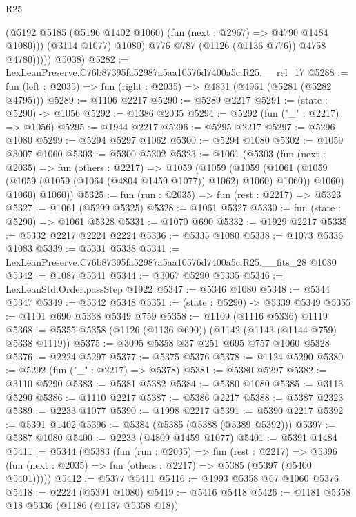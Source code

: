 \begin{lexlean}{R25}
\begin{coremodule}
                    (@5192 @5185 (@5196 @1402 @1060) (fun (next : @2967) => @4790 @1484 @1080)))
                  (@3114 @1077)
                  @1080)
                @776
                @787
                (@1126 (@1136 @776))
                @4758
                @4780)))))
      @5038)
@5282 := LexLeanPreserve.C76b87395fa52987a5aa10576d7400a5c.R25.__rel_17
@5288 := fun (left : @2035) => fun (right : @2035) => @4831 (@4961 (@5281 (@5282 @4795)))
@5289 := @1106 @2217
@5290 := @5289 @2217
@5291 := (state : @5290) -> @1056
@5292 := @1386 @2035
@5294 := @5292 (fun ("_" : @2217) => @1056)
@5295 := @1944 @2217
@5296 := @5295 @2217
@5297 := @5296 @1080
@5299 := @5294 @5297 @1062
@5300 := @5294 @1080
@5302 := @1059 @3007 @1060
@5303 := @5300 @5302
@5323 := @1061
    (@5303
      (fun (next : @2035) =>
      fun (others : @2217) =>
      @1059
        (@1059
          (@1059
            (@1061 (@1059 (@1059 (@1059 (@1064 (@4804 @1459 @1077)) @1062) @1060) @1060))
            @1060)
          @1060)
        @1060))
@5325 := fun (run : @2035) => fun (rest : @2217) => @5323
@5327 := @1061 (@5299 @5325)
@5328 := @1061 @5327
@5330 := fun (state : @5290) => @1061 @5328
@5331 := @1070 @690
@5332 := @1929 @2217
@5335 := @5332 @2217 @2224 @2224
@5336 := @5335 @1080
@5338 := @1073 @5336 @1083
@5339 := @5331 @5338
@5341 := LexLeanPreserve.C76b87395fa52987a5aa10576d7400a5c.R25.__fits_28 @1080
@5342 := @1087 @5341
@5344 := @3067 @5290 @5335
@5346 := LexLeanStd.Order.passStep @1922
@5347 := @5346 @1080
@5348 := @5344 @5347
@5349 := @5342 @5348
@5351 := (state : @5290) -> @5339 @5349
@5355 := @1101 @690 @5338 @5349 @759
@5358 := @1109 (@1116 @5336) @1119
@5368 := @5355 @5358 (@1126 (@1136 @690)) (@1142 (@1143 (@1144 @759) @5338 @1119))
@5375 := @3095 @5358 @37 @251 @695 @757 @1060 @5328
@5376 := @2224 @5297
@5377 := @5375 @5376
@5378 := @1124 @5290
@5380 := @5292 (fun ("_" : @2217) => @5378)
@5381 := @5380 @5297
@5382 := @3110 @5290
@5383 := @5381 @5382
@5384 := @5380 @1080
@5385 := @3113 @5290
@5386 := @1110 @2217
@5387 := @5386 @2217
@5388 := @5387 @2323
@5389 := @2233 @1077
@5390 := @1998 @2217
@5391 := @5390 @2217
@5392 := @5391 @1402
@5396 := @5384 (@5385 (@5388 (@5389 @5392)))
@5397 := @5387 @1080
@5400 := @2233 (@4809 @1459 @1077)
@5401 := @5391 @1484
@5411 := @5344
    (@5383
      (fun (run : @2035) =>
      fun (rest : @2217) =>
      @5396 (fun (next : @2035) => fun (others : @2217) => @5385 (@5397 (@5400 @5401)))))
@5412 := @5377 @5411
@5416 := @1993 @5358 @67 @1060 @5376
@5418 := @2224 (@5391 @1080)
@5419 := @5416 @5418
@5426 := @1181 @5358 @18 @5336 (@1186 (@1187 @5358 @18))

\end{coremodule}
\end{lexlean}
